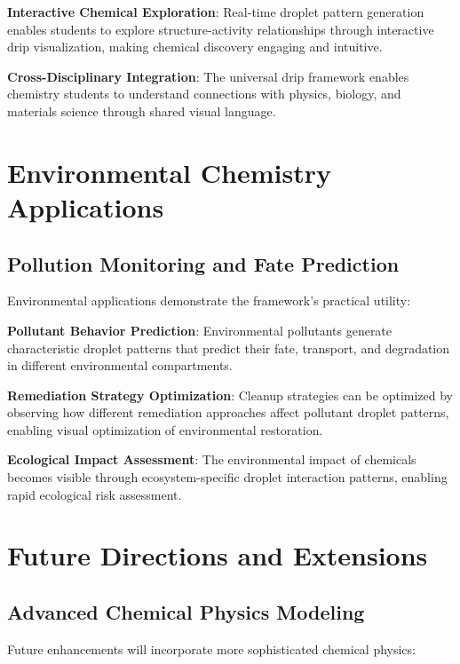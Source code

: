 \documentclass[12pt,a4paper]{article}
\begin{document}
\begin{algorithm}
\begin{algorithmic}[1]
\begin{table}[H]
\begin{table}[H]
\begin{table}[H]
{{{\textbf{Interactive Chemical Exploration}: Real-time droplet pattern generation enables students to explore structure-activity relationships through interactive drip visualization, making chemical discovery engaging and intuitive.

\textbf{Cross-Disciplinary Integration}: The universal drip framework enables chemistry students to understand connections with physics, biology, and materials science through shared visual language.

\section{Environmental Chemistry Applications}

\subsection{Pollution Monitoring and Fate Prediction}

Environmental applications demonstrate the framework's practical utility:

\textbf{Pollutant Behavior Prediction}: Environmental pollutants generate characteristic droplet patterns that predict their fate, transport, and degradation in different environmental compartments.

\textbf{Remediation Strategy Optimization}: Cleanup strategies can be optimized by observing how different remediation approaches affect pollutant droplet patterns, enabling visual optimization of environmental restoration.

\textbf{Ecological Impact Assessment}: The environmental impact of chemicals becomes visible through ecosystem-specific droplet interaction patterns, enabling rapid ecological risk assessment.

\section{Future Directions and Extensions}

\subsection{Advanced Chemical Physics Modeling}

Future enhancements will incorporate more sophisticated chemical physics:

}}}
\end{table}
\end{table}
\end{table}
\end{algorithmic}
\end{algorithm}
\end{document}
